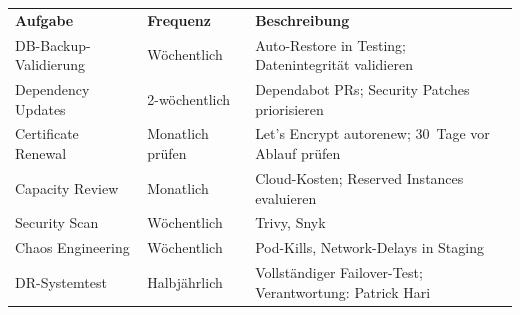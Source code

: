 \begin{tabularx}{\textwidth}{L{3.5cm} L{2.5cm} X}
  \color{white}\textbf{Aufgabe} & \color{white}\textbf{Frequenz} & \color{white}\textbf{Beschreibung} \\
  DB-Backup-Validierung & Wöchentlich & Auto-Restore in Testing; Datenintegrität validieren \\
  Dependency Updates & 2-wöchentlich & Dependabot PRs; Security Patches priorisieren \\
  Certificate Renewal & Monatlich prüfen & Let's Encrypt autorenew; 30~Tage vor Ablauf prüfen \\
  Capacity Review & Monatlich & Cloud-Kosten; Reserved Instances evaluieren \\
  Security Scan & Wöchentlich & Trivy, Snyk \\
  Chaos Engineering & Wöchentlich & Pod-Kills, Network-Delays in Staging \\
  DR-Systemtest & Halbjährlich & Vollständiger Failover-Test; Verantwortung: Patrick Hari \\
\end{tabularx}